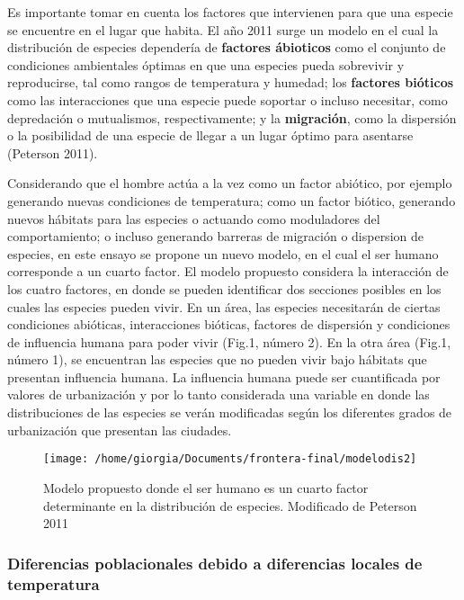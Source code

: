 \documentclass[]{article}
\begin{document}
Es importante tomar en cuenta los factores que intervienen para que una
especie se encuentre en el lugar que habita. El año 2011 surge un modelo
en el cual la distribución de especies dependería de \textbf{factores
ábioticos} como el conjunto de condiciones ambientales óptimas en que
una especies pueda sobrevivir y reproducirse, tal como rangos de
temperatura y humedad; los \textbf{factores bióticos} como las
interacciones que una especie puede soportar o incluso necesitar, como
depredación o mutualismos, respectivamente; y la \textbf{migración},
como la dispersión o la posibilidad de una especie de llegar a un lugar
óptimo para asentarse (Peterson 2011).

Considerando que el hombre actúa a la vez como un factor abiótico, por
ejemplo generando nuevas condiciones de temperatura; como un factor
biótico, generando nuevos hábitats para las especies o actuando como
moduladores del comportamiento; o incluso generando barreras de
migración o dispersion de especies, en este ensayo se propone un nuevo
modelo, en el cual el ser humano corresponde a un cuarto factor. El
modelo propuesto considera la interacción de los cuatro factores, en
donde se pueden identificar dos secciones posibles en los cuales las
especies pueden vivir. En un área, las especies necesitarán de ciertas
condiciones abióticas, interacciones bióticas, factores de dispersión y
condiciones de influencia humana para poder vivir (Fig.1, número 2). En
la otra área (Fig.1, número 1), se encuentran las especies que no pueden
vivir bajo hábitats que presentan influencia humana. La influencia
humana puede ser cuantificada por valores de urbanización y por lo tanto
considerada una variable en donde las distribuciones de las especies se
verán modificadas según los diferentes grados de urbanización que
presentan las ciudades.

\begin{figure}
\texttt{[image: /home/giorgia/Documents/frontera-final/modelodis2]} \caption{Modelo propuesto donde el ser humano es un cuarto factor determinante en la distribución de especies. Modificado de Peterson 2011}\label{fig:unnamed-chunk-1}
\end{figure}

\subsubsection{Diferencias poblacionales debido a diferencias locales de
temperatura}\label{diferencias-poblacionales-debido-a-diferencias-locales-de-temperatura}
\end{document}
